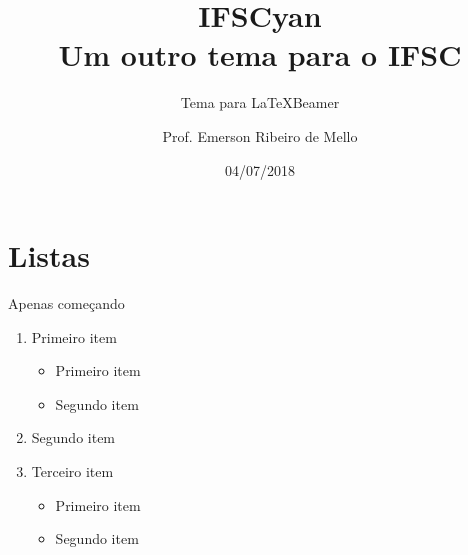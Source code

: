\documentclass{beamer}
\title{IFSCyan \\ Um outro tema para o IFSC}
\subtitle{Tema para \LaTeX Beamer}
\author{Prof. Emerson Ribeiro de Mello}
\institute{
\url{mello@ifsc.edu.br}}
\date{04/07/2018}
\let\olditem\item
\renewcommand{\item}{%
\olditem\vspace{\fill}}
\begin{document}
\begin{frame}
	\maketitle
\end{frame}


\section{Listas}

\begin{frame}{Apenas começando}
	\begin{enumerate}
		\item Primeiro item
		\begin{itemize}
			\item Primeiro item
			\item Segundo item
		\end{itemize}
		\item Segundo item
		\item Terceiro item 
		\begin{itemize}
			\item Primeiro item
			\item Segundo item
		\end{itemize}
	\end{enumerate}
\end{frame}
\end{document}
